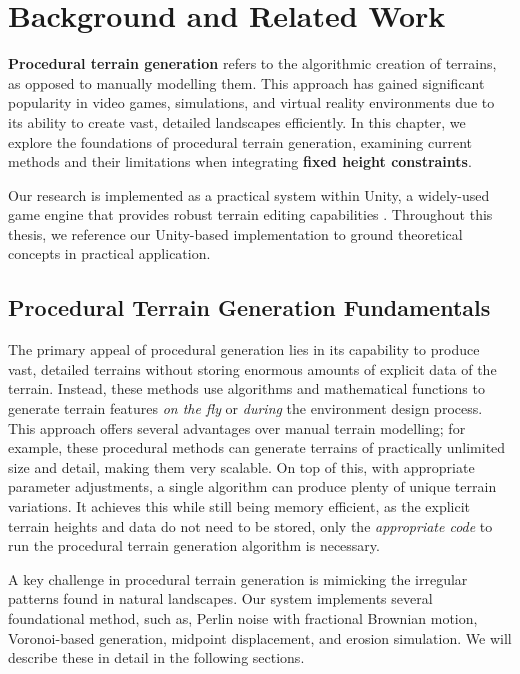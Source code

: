 \chapter{Background and Related Work}
\label{Chapter1}

\textbf{Procedural terrain generation} refers to the algorithmic creation of terrains, as opposed to manually modelling them. This approach has gained significant popularity in video games, simulations, and virtual reality environments due to its ability to create vast, detailed landscapes efficiently. In this chapter, we explore the foundations of procedural terrain generation, examining current methods and their limitations when integrating \textbf{fixed height constraints}.

Our research is implemented as a practical system within Unity, a widely-used game engine that provides robust terrain editing capabilities \citep{UnityTerrainDocs}. Throughout this thesis, we reference our Unity-based implementation to ground theoretical concepts in practical application.

\section{Procedural Terrain Generation Fundamentals}
\label{ptg_fundamentals}

The primary appeal of procedural generation lies in its capability to produce vast, detailed terrains without storing enormous amounts of explicit data of the terrain. Instead, these methods use algorithms and mathematical functions to generate terrain features \textit{on the fly} or \textit{during} the environment design process. This approach offers several advantages over manual terrain modelling; for example, these procedural methods can generate terrains of practically unlimited size and detail, making them very scalable. On top of this, with appropriate parameter adjustments, a single algorithm can produce plenty of unique terrain variations. It achieves this while still being memory efficient, as the explicit terrain heights and data do not need to be stored, only the \textit{appropriate code} to run the procedural terrain generation algorithm is necessary.

A key challenge in procedural terrain generation is mimicking the irregular patterns found in natural landscapes. Our system implements several foundational method, such as, Perlin noise with fractional Brownian motion, Voronoi-based generation, midpoint displacement, and erosion simulation. We will describe these in detail in the following sections.

